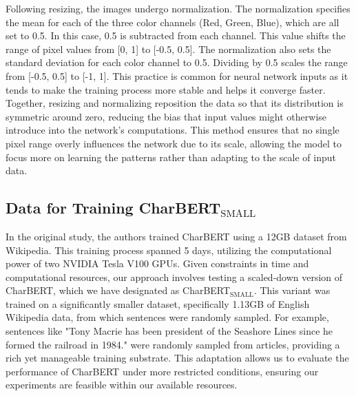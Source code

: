 Following resizing, the images undergo normalization. The normalization specifies the mean for each of the three color channels (Red, Green, Blue), which are all set to 0.5. In this case, 0.5 is subtracted from each channel. This value shifts the range of pixel values from [0, 1] to [-0.5, 0.5]. The normalization also sets the standard deviation for each color channel to 0.5. Dividing by 0.5 scales the range from [-0.5, 0.5] to [-1, 1]. This practice is common for neural network inputs as it tends to make the training process more stable and helps it converge faster. Together, resizing and normalizing reposition the data so that its distribution is symmetric around zero, reducing the bias that input values might otherwise introduce into the network's computations. This method ensures that no single pixel range overly influences the network due to its scale, allowing the model to focus more on learning the patterns rather than adapting to the scale of input data.


\subsection{Data for Training CharBERT$_{\text{SMALL}}$}
\label{subsec:3_data_for_training_charbert}
In the original study, the authors trained CharBERT using a 12GB dataset from Wikipedia. This training process spanned 5 days, utilizing the computational power of two NVIDIA Tesla V100 GPUs. Given constraints in time and computational resources, our approach involves testing a scaled-down version of CharBERT, which we have designated as CharBERT$_{\text{SMALL}}$. This variant was trained on a significantly smaller dataset, specifically 1.13GB of English Wikipedia data, from which sentences were randomly sampled. For example, sentences like "Tony Macrie has been president of the Seashore Lines since he formed the railroad in 1984." were randomly sampled from articles, providing a rich yet manageable training substrate. This adaptation allows us to evaluate the performance of CharBERT under more restricted conditions, ensuring our experiments are feasible within our available resources.
